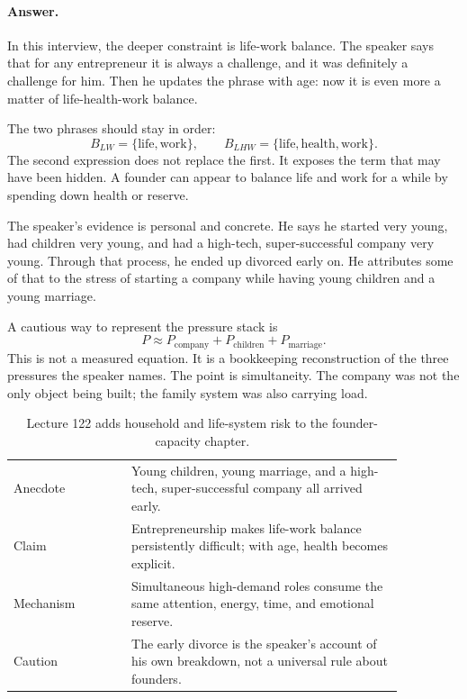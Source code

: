 \documentclass[11pt,oneside]{book}
\begin{document}
\paragraph{Answer.}
In this interview, the deeper constraint is life-work balance. The speaker says that for any entrepreneur it is always a challenge, and it was definitely a challenge for him. Then he updates the phrase with age: now it is even more a matter of life-health-work balance.

The two phrases should stay in order:
\[
B_{LW}=\{\text{life},\text{work}\},
\qquad
B_{LHW}=\{\text{life},\text{health},\text{work}\}.
\]
The second expression does not replace the first. It exposes the term that may have been hidden. A founder can appear to balance life and work for a while by spending down health or reserve.

The speaker's evidence is personal and concrete. He says he started very young, had children very young, and had a high-tech, super-successful company very young. Through that process, he ended up divorced early on. He attributes some of that to the stress of starting a company while having young children and a young marriage.

A cautious way to represent the pressure stack is
\[
P
\approx
P_{\text{company}}
+
P_{\text{children}}
+
P_{\text{marriage}}.
\]
This is not a measured equation. It is a bookkeeping reconstruction of the three pressures the speaker names. The point is simultaneity. The company was not the only object being built; the family system was also carrying load.

\begin{table}
\centering
\small
\begin{tabular}{p{0.26\linewidth}p{0.60\linewidth}}
\hline
Anecdote & Young children, young marriage, and a high-tech, super-successful company all arrived early.\\
Claim & Entrepreneurship makes life-work balance persistently difficult; with age, health becomes explicit.\\
Mechanism & Simultaneous high-demand roles consume the same attention, energy, time, and emotional reserve.\\
Caution & The early divorce is the speaker's account of his own breakdown, not a universal rule about founders.\\
\hline
\end{tabular}
\caption{Lecture 122 adds household and life-system risk to the founder-capacity chapter.}
\end{table}
\end{document}
